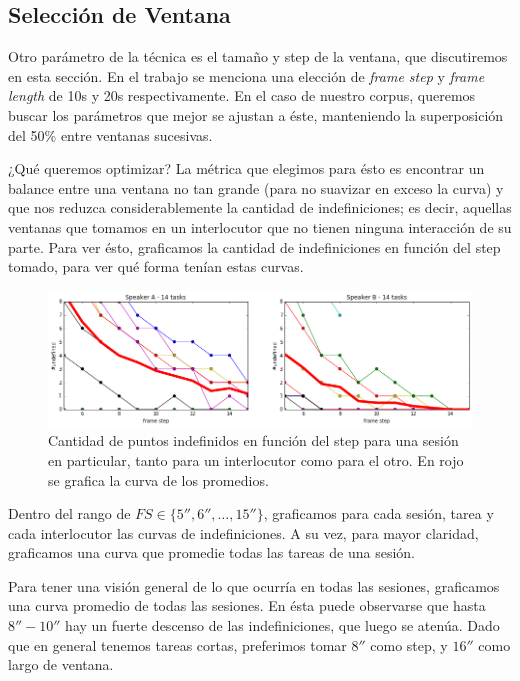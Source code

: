 \subsection{Selección de Ventana}
\label{sec:window_selection}

Otro parámetro de la técnica es el tamaño y step de la ventana, que discutiremos en esta sección. En el trabajo \cite{KOU2008.2} se menciona una elección de \emph{frame step} y \emph{frame length} de 10s y 20s respectivamente. En el caso de nuestro corpus, queremos buscar los parámetros que mejor se ajustan a éste, manteniendo la superposición del 50\% entre ventanas sucesivas.

¿Qué queremos optimizar? La métrica que elegimos para ésto es encontrar un balance entre una ventana no tan grande (para no suavizar en exceso la curva) y que nos reduzca considerablemente la cantidad de indefiniciones; es decir, aquellas ventanas que tomamos en un interlocutor que no tienen ninguna interacción de su parte. Para ver ésto, graficamos la cantidad de indefiniciones en función del step tomado, para ver qué forma tenían estas curvas.

\begin{figure}
\centering
\includegraphics[width=15cm]{images/window_selection_for_session.png}
\caption{Cantidad de puntos indefinidos en función del step para una sesión en particular, tanto para un interlocutor como para el otro. En rojo se grafica la curva de los promedios. }
\end{figure}



Dentro del rango de $FS \in \{5'',6'', \ldots ,15'' \}$, graficamos para cada sesión, tarea y cada interlocutor las curvas de indefiniciones. A su vez, para mayor claridad, graficamos una curva que promedie todas las tareas de una sesión.


Para tener una visión general de lo que ocurría en todas las sesiones, graficamos una curva promedio de todas las sesiones. En ésta puede observarse que hasta $8''-10''$ hay un fuerte descenso de las indefiniciones, que luego se atenúa. Dado que en general tenemos tareas cortas, preferimos tomar $8''$ como step, y $16''$ como largo de ventana.


